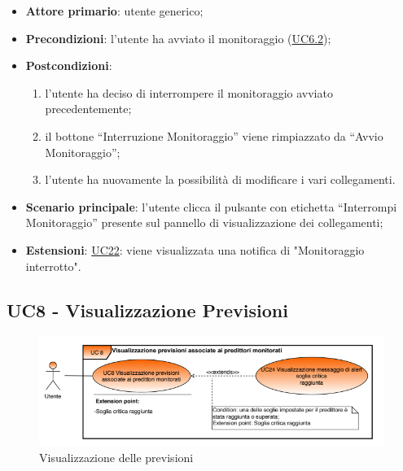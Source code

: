 		\begin{itemize}
			\item\textbf{Attore primario}: utente generico;
			\item\textbf{Precondizioni}: l’utente ha avviato il monitoraggio (\hyperref[par:UC6.2]{UC6.2});
			\item\textbf{Postcondizioni}:
				\begin{enumerate}
					\item l’utente ha deciso di interrompere il monitoraggio avviato precedentemente;
					\item il bottone “Interruzione Monitoraggio” viene rimpiazzato da “Avvio Monitoraggio”;
					\item l’utente ha nuovamente la possibilità di modificare i vari collegamenti.
				\end{enumerate}	
			\item\textbf{Scenario principale}: l’utente clicca il pulsante con etichetta “Interrompi Monitoraggio” presente sul pannello di visualizzazione dei collegamenti;
			\item\textbf{Estensioni}: \hyperref[par:UC22]{UC22}: viene visualizzata una notifica di "Monitoraggio interrotto".		
		\end{itemize}


	\label{par:UC8}
	\subsection{UC8 - Visualizzazione Previsioni}

	\begin{figure}[H]
		\centering
		\includegraphics[scale=0.80]{../Analisi_dei_requisiti/img/Diagrammi_UML/UC8_Visualizzazione_previsioni.png}
		\caption{Visualizzazione delle previsioni}
	\end{figure}

